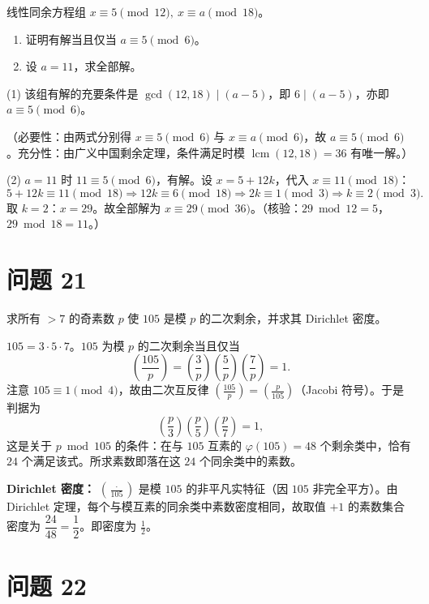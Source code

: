 \documentclass{article}
\newcommand{\leg}[2]{\left(\frac{#1}{#2}\right)}
\begin{document}
线性同余方程组 $x\equiv5\pmod{12},\ x\equiv a\pmod{18}$。

\begin{enumerate}[(1)]
  \item 证明有解当且仅当 $a\equiv5\pmod6$。
  \item 设 $a=11$，求全部解。
\end{enumerate}

\begin{solution}
  (1) 该组有解的充要条件是 $\gcd(12,18)\mid(a-5)$，即 $6\mid(a-5)$，亦即 $a\equiv5\pmod6$。

  （必要性：由两式分别得 $x\equiv5\pmod6$ 与 $x\equiv a\pmod6$，故 $a\equiv5\pmod6$。充分性：由广义中国剩余定理，条件满足时模 $\operatorname{lcm}(12,18)=36$ 有唯一解。）

  (2) $a=11$ 时 $11\equiv5\pmod6$，有解。设 $x=5+12k$，代入 $x\equiv11\pmod{18}$：
  \[
    5+12k\equiv11\pmod{18}\Rightarrow 12k\equiv6\pmod{18}\Rightarrow 2k\equiv1\pmod3\Rightarrow k\equiv2\pmod3 .
  \]
  取 $k=2$：$x=29$。故全部解为 $\boxed{x\equiv29\pmod{36}}$。（核验：$29\bmod12=5$，$29\bmod18=11$。）
\end{solution}

\section{问题 21}

求所有 $>7$ 的奇素数 $p$ 使 $105$ 是模 $p$ 的二次剩余，并求其 Dirichlet 密度。

\begin{solution}
  $105=3\cdot5\cdot7$。$105$ 为模 $p$ 的二次剩余当且仅当
  \[
    \leg{105}{p}=\leg3p\leg5p\leg7p=1 .
  \]
  注意 $105\equiv1\pmod4$，故由二次互反律 $\leg{105}{p}=\leg{p}{105}$（Jacobi 符号）。于是判据为
  \[
    \boxed{\ \leg{p}{3}\leg{p}{5}\leg{p}{7}=1,\ }
  \]
  这是关于 $p\bmod105$ 的条件：在与 $105$ 互素的 $\varphi(105)=48$ 个剩余类中，恰有 $24$ 个满足该式。所求素数即落在这 $24$ 个同余类中的素数。

  \textbf{Dirichlet 密度：} $\leg{\cdot}{105}$ 是模 $105$ 的非平凡实特征（因 $105$ 非完全平方）。由 Dirichlet 定理，每个与模互素的同余类中素数密度相同，故取值 $+1$ 的素数集合密度为 $\dfrac{24}{48}=\dfrac12$。即密度为 $\boxed{\tfrac12}$。
\end{solution}

\section{问题 22}
\end{document}
